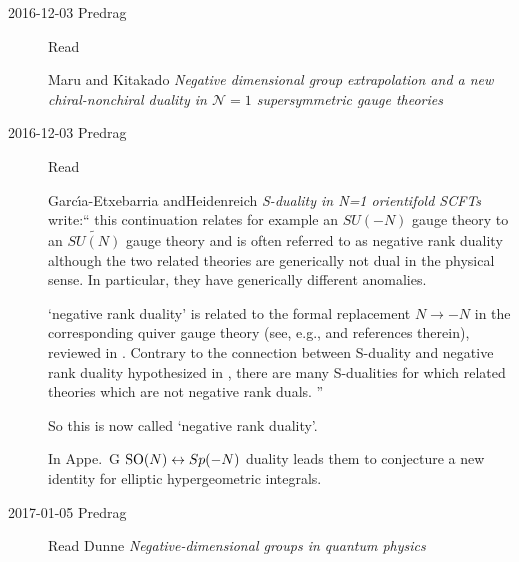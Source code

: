 \begin{description}
\item[2016-12-03 Predrag]
Read

Maru and Kitakado
{\em Negative dimensional group extrapolation and a new chiral-nonchiral
duality in ${\mathcal N} = 1$ supersymmetric gauge theories}

\item[2016-12-03 Predrag]
Read

Garc{\'{\i}}a-Etxebarria andHeidenreich
{\em S-duality in N=1 orientifold {SCFTs}} write:``
this continuation relates for example an $SU(-N)$ gauge theory to an
$\tilde{SU(N)}$ gauge theory and is often referred to as negative rank duality
although the two related theories are generically not dual in the physical
sense. In particular, they have generically different anomalies.

`negative rank duality' is related to the formal replacement $N \to -N$ in the
corresponding quiver gauge theory (see, e.g.,  and references
therein), reviewed in . Contrary to the connection between
S-duality and negative rank duality hypothesized in ,
there are many S-dualities for which related theories which are not negative
rank duals.
''

So this is now called `negative rank duality'.

In Appe.~G $\textrm{SO}(N) \leftrightarrow Sp(-N)$ duality leads them to conjecture
a new identity for elliptic hypergeometric integrals.

\item[2017-01-05 Predrag]
Read Dunne
{\em Negative-dimensional groups in quantum physics}


\end{description}


\printbibliography[heading=subbibintoc,title={References}]
